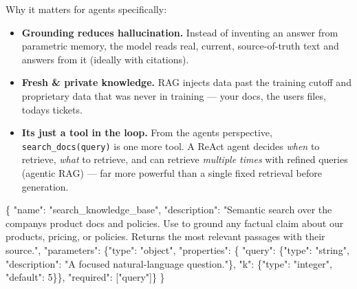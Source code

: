 \documentclass[11pt]{article}
\providecommand{\tightlist}{\setlength{\itemsep}{1pt}\setlength{\parskip}{0pt}}
\newenvironment{Shaded}{\begin{snugshade}}{\end{snugshade}}
\newcommand{\DataTypeTok}[1]{\textcolor[rgb]{0.16,0.50,0.73}{#1}}
\newcommand{\DecValTok}[1]{\textcolor[rgb]{0.96,0.45,0.00}{#1}}
\newcommand{\FunctionTok}[1]{\textcolor[rgb]{0.56,0.27,0.68}{#1}}
\newcommand{\OtherTok}[1]{\textcolor[rgb]{0.15,0.68,0.38}{#1}}
\newcommand{\StringTok}[1]{\textcolor[rgb]{0.96,0.31,0.31}{#1}}
\begin{document}
Why it matters for agents specifically:

\begin{itemize}
\tightlist
\item
  \textbf{Grounding reduces hallucination.} Instead of inventing an answer from parametric memory, the model reads real, current, source-of-truth text and answers from it (ideally with citations).
\item
  \textbf{Fresh \& private knowledge.} RAG injects data past the training cutoff and proprietary data that was never in training --- your docs, the user\textquotesingle s files, today\textquotesingle s tickets.
\item
  \textbf{It\textquotesingle s just a tool in the loop.} From the agent\textquotesingle s perspective, \texttt{search\_docs(query)} is one more tool. A ReAct agent decides \emph{when} to retrieve, \emph{what} to retrieve, and can retrieve \emph{multiple times} with refined queries (agentic RAG) --- far more powerful than a single fixed retrieval before generation.
\end{itemize}


\begin{Shaded}
\begin{Highlighting}[]
\FunctionTok{\{}
  \DataTypeTok{"name"}\FunctionTok{:} \StringTok{"search\_knowledge\_base"}\FunctionTok{,}
  \DataTypeTok{"description"}\FunctionTok{:} \StringTok{"Semantic search over the company\textquotesingle{}s product docs and policies. Use to ground any factual claim about our products, pricing, or policies. Returns the most relevant passages with their source."}\FunctionTok{,}
  \DataTypeTok{"parameters"}\FunctionTok{:} \FunctionTok{\{}\DataTypeTok{"type"}\FunctionTok{:} \StringTok{"object"}\FunctionTok{,}
    \DataTypeTok{"properties"}\FunctionTok{:} \FunctionTok{\{}
      \DataTypeTok{"query"}\FunctionTok{:} \FunctionTok{\{}\DataTypeTok{"type"}\FunctionTok{:} \StringTok{"string"}\FunctionTok{,} \DataTypeTok{"description"}\FunctionTok{:} \StringTok{"A focused natural{-}language question."}\FunctionTok{\},}
      \DataTypeTok{"k"}\FunctionTok{:} \FunctionTok{\{}\DataTypeTok{"type"}\FunctionTok{:} \StringTok{"integer"}\FunctionTok{,} \DataTypeTok{"default"}\FunctionTok{:} \DecValTok{5}\FunctionTok{\}\},}
    \DataTypeTok{"required"}\FunctionTok{:} \OtherTok{[}\StringTok{"query"}\OtherTok{]}\FunctionTok{\}}
\FunctionTok{\}}
\end{Highlighting}
\end{Shaded}
\end{document}

